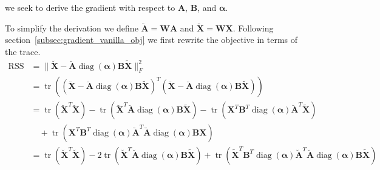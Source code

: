 \documentclass{article}
\begin{document}
we seek to derive the gradient with respect to $\mathbf{A}$, $\mathbf{B}$, and $\boldsymbol{\alpha}$.

To simplify the derivation we define $\breve{\mathbf{A}} = \mathbf{W} \mathbf{A}$ and $\breve{\mathbf{X}} = \mathbf{W} \mathbf{X}$. Following section~\ref{subsec:gradient_vanilla_obj} we first rewrite the objective in terms of the trace.
\begin{equation}
    \label{eq:relaxed_weighted_objective_trace}
    \begin{aligned}
        \operatorname{RSS} &= \| \breve{\mathbf{X}} - \breve{\mathbf{A}} \operatorname{diag}(\boldsymbol{\alpha}) \mathbf{B} \tilde{\mathbf{X}} \|_F^2 \\
        &= \operatorname{tr} \left( \left( \breve{\mathbf{X}} - \breve{\mathbf{A}} \operatorname{diag}(\boldsymbol{\alpha}) \mathbf{B} \tilde{\mathbf{X}} \right)^T
            \left( \breve{\mathbf{X}} - \breve{\mathbf{A}} \operatorname{diag}(\boldsymbol{\alpha}) \mathbf{B} \tilde{\mathbf{X}} \right) \right) \\
        &= \operatorname{tr} \left( \breve{\mathbf{X}}^T \breve{\mathbf{X}} \right)
            - \operatorname{tr} \left( \breve{\mathbf{X}}^T \breve{\mathbf{A}} \operatorname{diag}(\boldsymbol{\alpha}) \mathbf{B} \tilde{\mathbf{X}} \right)
            - \operatorname{tr} \left( \mathbf{X}^T \mathbf{B}^T \operatorname{diag}(\boldsymbol{\alpha}) \breve{\mathbf{A}}^T \tilde{\mathbf{X}} \right) \\
        &\quad + \operatorname{tr} \left( \mathbf{X}^T \mathbf{B}^T \operatorname{diag}(\boldsymbol{\alpha}) \breve{\mathbf{A}}^T \breve{\mathbf{A}} \operatorname{diag}(\boldsymbol{\alpha}) \mathbf{B} \mathbf{X} \right) \\
        &= \operatorname{tr}\left( \breve{\mathbf{X}}^T \breve{\mathbf{X}} \right)
            - 2 \operatorname{tr} \left( \breve{\mathbf{X}}^T \breve{\mathbf{A}} \operatorname{diag}(\boldsymbol{\alpha}) \mathbf{B} \tilde{\mathbf{X}} \right)
            + \operatorname{tr} \left( \tilde{\mathbf{X}}^T \mathbf{B}^T \operatorname{diag}(\boldsymbol{\alpha}) \breve{\mathbf{A}}^T \breve{\mathbf{A}} \operatorname{diag}(\boldsymbol{\alpha}) \mathbf{B} \tilde{\mathbf{X}} \right) \\
    \end{aligned}
\end{equation}
\end{document}
